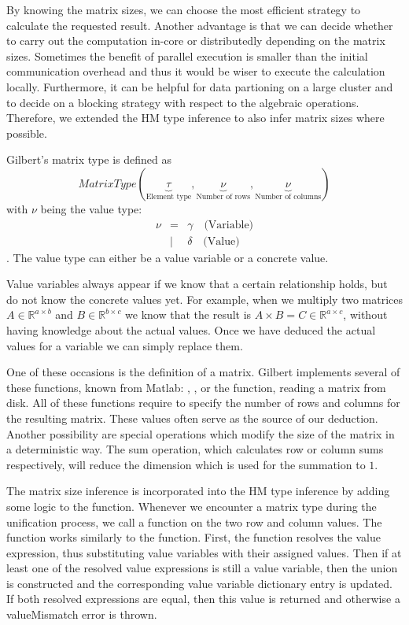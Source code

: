 By knowing the matrix sizes, we can choose the most efficient strategy to calculate the requested result.
Another advantage is that we can decide whether to carry out the computation in-core or distributedly depending on the matrix sizes.
Sometimes the benefit of parallel execution is smaller than the initial communication overhead and thus it would be wiser to execute the calculation locally.
Furthermore, it can be helpful for data partioning on a large cluster and to decide on a blocking strategy with respect to the algebraic operations.
Therefore, we extended the HM type inference to also infer matrix sizes where possible.

Gilbert's matrix type is defined as 
\begin{displaymath}
MatrixType(\underbrace{\tau}_{\text{Element type}},\underbrace{\nu}_{\text{Number of rows}},\underbrace{\nu}_{\text{Number of columns}})
\end{displaymath}
with $\nu$ being the value type:
\begin{eqnarray*}
	\nu &=& \gamma\quad\text{(Variable)} \\
	&|& \delta\quad\text{(Value)}
\end{eqnarray*}
.
The value type can either be a value variable or a concrete value.

Value variables always appear if we know that a certain relationship holds, but do not know the concrete values yet.
For example, when we multiply two matrices $A\in\mathbb{R}^{a\times b}$ and $B\in\mathbb{R}^{b\times c}$ we know that the result is $A\times B = C \in \mathbb{R}^{a\times c}$, without having knowledge about the actual values.
Once we have deduced the actual values for a variable we can simply replace them.

One of these occasions is the definition of a matrix.
Gilbert implements several of these functions, known from Matlab: , ,  or the  function, reading a matrix from disk.
All of these functions require to specify the number of rows and columns for the resulting matrix.
These values often serve as the source of our deduction.
Another possibility are special operations which modify the size of the matrix in a deterministic way.
The sum operation, which calculates row or column sums respectively, will reduce the dimension which is used for the summation to $1$.

The matrix size inference is incorporated into the HM type inference by adding some logic to the  function.
Whenever we encounter a matrix type during the unification process, we call a  function on the two row and column values.
The  function works similarly to the  function.
First, the function resolves the value expression, thus substituting value variables with their assigned values.
Then if at least one of the resolved value expressions is still a value variable, then the union is constructed and the corresponding value variable dictionary entry is updated.
If both resolved expressions are equal, then this value is returned and otherwise a valueMismatch error is thrown.